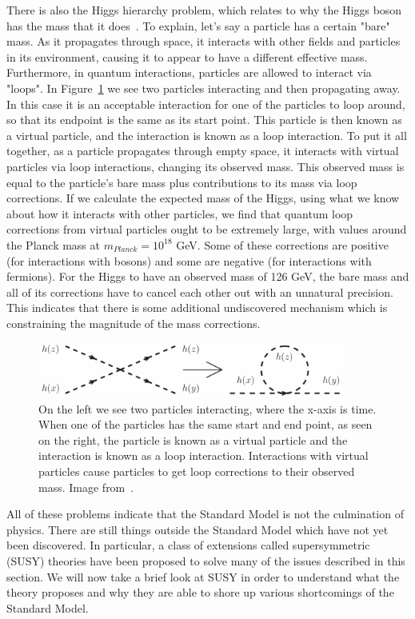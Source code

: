 There is also the Higgs hierarchy problem, which relates to why the Higgs boson has the mass that it does~\cite{SUSY_primer}. To explain, let's say a particle has a certain "bare" mass. As it propagates through space, it interacts with other fields and particles in its environment, causing it to appear to have a different effective mass. Furthermore, in quantum interactions, particles are allowed to interact via "loops". In Figure~\ref{fig:quantum_loops} we see two particles interacting and then propagating away. In this case it is an acceptable interaction for one of the particles to loop around, so that its endpoint is the same as its start point. This particle is then known as a virtual particle, and the interaction is known as a loop interaction. To put it all together, as a particle propagates through empty space, it interacts with virtual particles via loop interactions, changing its observed mass. This observed mass is equal to the particle's bare mass plus contributions to its mass via loop corrections. If we calculate the expected mass of the Higgs, using what we know about how it interacts with other particles, we find that quantum loop corrections from virtual particles ought to be extremely large, with values around the Planck mass at $m_{Planck} = 10^{18}$ GeV. Some of these corrections are positive (for interactions with bosons) and some are negative (for interactions with fermions). For the Higgs to have an observed mass of 126 GeV, the bare mass and all of its corrections have to cancel each other out with an unnatural precision. This indicates that there is some additional undiscovered mechanism which is constraining the magnitude of the mass corrections.

\begin{figure}[htbp]
    \centering
    \includegraphics[width=0.9\textwidth]{Images/loop_correction.png}
    \caption{On the left we see two particles interacting, where the x-axis is time. When one of the particles has the same start and end point, as seen on the right, the particle is known as a virtual particle and the interaction is known as a loop interaction. Interactions with virtual particles cause particles to get loop corrections to their observed mass. Image from~\cite{loop_correction}.}
    \label{fig:quantum_loops}
\end{figure}

All of these problems indicate that the Standard Model is not the culmination of physics. There are still things outside the Standard Model which have not yet been discovered. In particular, a class of extensions called supersymmetric (SUSY) theories have been proposed to solve many of the issues described in this section. We will now take a brief look at SUSY in order to understand what the theory proposes and why they are able to shore up various shortcomings of the Standard Model.